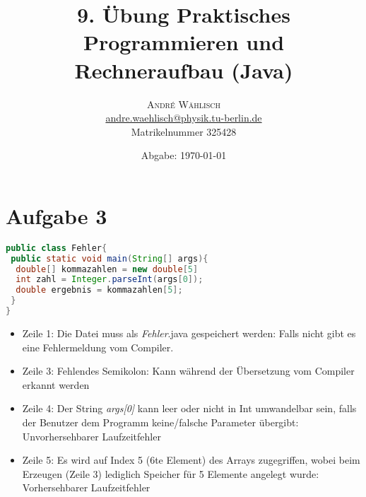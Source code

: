 \documentclass{scrartcl}
\begin{document}
\title{9. Übung Praktisches Programmieren und Rechneraufbau (Java)}

\date{Abgabe: \today}

\author{
\large
\textsc{André Wählisch}\\[2mm]
\normalsize \href{mailto:andre.waehlisch@physik.tu-berlin.de}{andre.waehlisch@physik.tu-berlin.de} \\
\normalsize Matrikelnummer 325428 
}

\maketitle

\section*{Aufgabe 3}

\begin{lstlisting}[language=java]
public class Fehler{
 public static void main(String[] args){
  double[] kommazahlen = new double[5]
  int zahl = Integer.parseInt(args[0]);
  double ergebnis = kommazahlen[5];
 }
}
\end{lstlisting}

\begin{itemize}
	\item Zeile 1: Die Datei muss als \emph{Fehler}.java gespeichert werden: Falls nicht gibt es eine Fehlermeldung vom Compiler.
	\item Zeile 3: Fehlendes Semikolon: Kann während der Übersetzung vom Compiler erkannt werden
	\item Zeile 4: Der String \emph{args[0]} kann leer oder nicht in Int umwandelbar sein, falls der Benutzer dem Programm keine/falsche Parameter übergibt: Unvorhersehbarer Laufzeitfehler
	\item Zeile 5: Es wird auf Index 5 (6te Element) des Arrays zugegriffen, wobei beim Erzeugen (Zeile 3) lediglich Speicher für 5 Elemente angelegt wurde: Vorhersehbarer Laufzeitfehler
\end{itemize}
\end{document}
